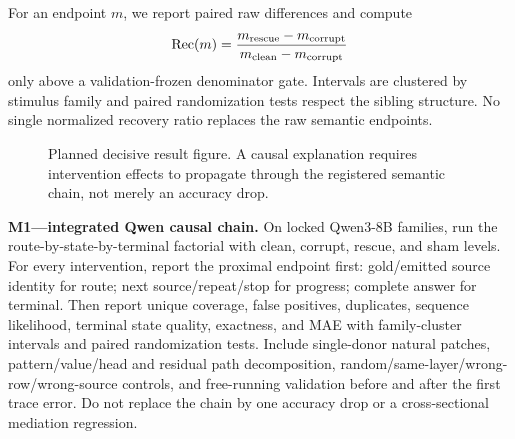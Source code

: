 For an endpoint \(m\), we report paired raw differences and compute
\[
  \operatorname{Rec}(m)=
  \frac{m_{\rm rescue}-m_{\rm corrupt}}
       {m_{\rm clean}-m_{\rm corrupt}}
\]
only above a validation-frozen denominator gate. Intervals are clustered by
stimulus family and paired randomization tests respect the sibling structure.
No single normalized recovery ratio replaces the raw semantic endpoints.

\begin{figure}[H]
\centering
{}
\caption{Planned decisive result figure. A causal explanation requires
intervention effects to propagate through the registered semantic chain, not
merely an accuracy drop.}
\label{fig:mediation-todo}
\end{figure}

\begin{todobox}
\textbf{M1---integrated Qwen causal chain.}
On locked Qwen3-8B families, run the route-by-state-by-terminal factorial with
clean, corrupt, rescue, and sham levels. For every intervention, report the
proximal endpoint first: gold/emitted source identity for route; next
source/repeat/stop for progress; complete answer for terminal. Then report
unique coverage, false positives, duplicates, sequence likelihood, terminal
state quality, exactness, and MAE with family-cluster intervals and paired
randomization tests. Include single-donor natural patches, pattern/value/head
and residual path decomposition, random/same-layer/wrong-row/wrong-source
controls, and free-running validation before and after the first trace error.
Do not replace the chain by one accuracy drop or a cross-sectional mediation
regression.
\end{todobox}

